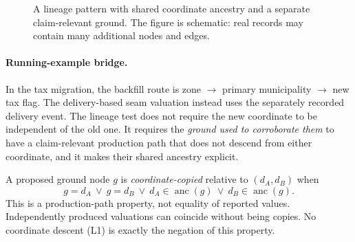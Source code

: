 \documentclass[twocolumn,envcountsect,envcountsame,natbib]{svjour3}
\begin{document}
\begin{figure}[htbp]
\centering
{}
\caption{A lineage pattern with shared coordinate ancestry and a separate claim-relevant ground. The figure is schematic: real records may contain many additional nodes and edges.}
\label{ex:fig:lineage-dag}
\end{figure}

\paragraph{Running-example bridge.} In the tax migration, the backfill route is zone $\to$ primary municipality $\to$ new tax flag. The delivery-based seam valuation instead uses the separately recorded delivery event. The lineage test does not require the new coordinate to be independent of the old one. It requires the \emph{ground used to corroborate them} to have a claim-relevant production path that does not descend from either coordinate, and it makes their shared ancestry explicit.

\begin{definition}\label{ex:def:copied-ground}
A proposed ground node $g$ is \emph{coordinate-copied} relative to $(d_A,d_B)$ when
\[
g=d_A\ \lor\ g=d_B\ \lor\ d_A\in\operatorname{anc}(g)\ \lor\ d_B\in\operatorname{anc}(g).
\]
This is a production-path property, not equality of reported values. Independently produced valuations can coincide without being copies. No coordinate descent (L1) is exactly the negation of this property.
\end{definition}
\end{document}
